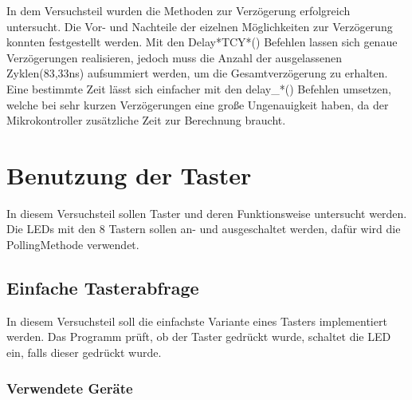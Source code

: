 \documentclass[12pt,a4paper]{article}
\begin{document}
In dem Versuchsteil wurden die Methoden zur Verzögerung erfolgreich untersucht. Die Vor- und Nachteile der eizelnen Möglichkeiten zur Verzögerung konnten festgestellt werden. Mit den Delay*TCY*() Befehlen lassen sich genaue Verzögerungen realisieren, jedoch muss die Anzahl der ausgelassenen Zyklen(83,33ns) aufsummiert werden, um die Gesamtverzögerung zu erhalten. Eine bestimmte Zeit lässt sich einfacher mit den delay\_*() Befehlen umsetzen, welche bei sehr kurzen Verzögerungen eine große Ungenauigkeit haben, da der Mikrokontroller zusätzliche Zeit zur Berechnung braucht.

\section{Benutzung der Taster}

In diesem Versuchsteil sollen Taster und deren Funktionsweise untersucht werden. Die LEDs mit den 8 Tastern sollen an- und ausgeschaltet werden, dafür wird die PollingMethode verwendet.

\subsection{Einfache Tasterabfrage}

In diesem Versuchsteil soll die einfachste Variante eines Tasters implementiert werden. Das Programm prüft, ob der Taster gedrückt wurde, schaltet die LED ein, falls dieser gedrückt wurde.

\subsubsection*{Verwendete Geräte}
\end{document}

